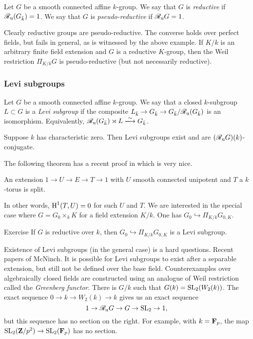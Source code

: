Let $G$ be a smooth connected affine $k$-group. We say that $G$ is 
\emph{reductive} if $\mathscr{R}_{\mathrm{u}} (G_{\bar k})=1$. We say that $G$ is 
\emph{pseudo-reductive} if $\mathscr{R}_{\mathrm{u}}  G=1$. 

Clearly reductive groups are pseudo-reductive. The converse holds over 
perfect fields, but fails in general, as is witnessed by the above example. 
If $K/k$ is an arbitrary finite field extension and $G$ is a reductive 
$K$-group, then the Weil restriction $\Pi_{K/k} G$ is pseudo-reductive 
(but not necessarily reductive). 


\subsubsection{Levi subgroups}

Let $G$ be a smooth connected affine $k$-group. We say that a closed 
$k$-subgroup $L\subset G$ is a \emph{Levi subgroup} if the composite 
$L_{\bar k} \to G_{\bar k} \to G_{\bar k}/\mathscr{R}_{\mathrm{u}} (G_{\bar k})$ is an 
isomorphism. Equivalently, 
$\sR_\unipotent (G_{\bar k})\rtimes L\isomorphism G_{\bar k}$. 

\begin{theo}[Mostow]
Suppose $k$ has characteristic zero. Then Levi subgroups exist and are 
$(\mathscr{R}_{\mathrm{u}} G)(k)$-conjugate. 
\end{theo}

The following theorem has a recent proof in \cite{demarche} which is very nice. 

\begin{theo}[SGA 3]
An extension $1 \to U \to E\to T\to 1$ with $U$ smooth connected unipotent and 
$T$ a $k$-torus is split. 
\end{theo}

In other words, $\operatorname{H}^1(T,U)=0$ for such $U$ and $T$. We are interested in the 
special case where $G=G_0\times_k K$ for a field extension $K/k$. 
One has $G_0\hookrightarrow \Pi_{K/k} G_{0,K}$. 

\begin{enonce}[remark]{Exercise}
If $G$ is reductive over $k$, then $G_0\hookrightarrow \Pi_{K/k} G_{0,K}$ is a 
Levi subgroup. 
\end{enonce}


Existence of Levi subgroups (in the general case) is a hard questions. Recent 
papers of McNinch. It is possible for Levi subgroups to exist after a 
separable extension, but still not be defined over the base field. Counterexamples 
over algebraically closed fields are constructed using an analogue of Weil 
restriction called the \emph{Greenberg functor}. There is $G/k$ such that 
$G(k)=\operatorname{SL}_2(W_2(k))$. The exact sequence 
$0 \to k \to W_2(k) \to k$ gives us an exact sequence 
\[
  1 \to \mathscr{R}_{\mathrm{u}}  G \to G \to \operatorname{SL}_2 \to 1 ,
\]
but this sequence has no section on the right. For example, with 
$k=\mathbf{F}_p$, the map $\operatorname{SL}_2(\mathbf{Z}/p^2) \to \operatorname{SL}_2(\mathbf{F}_p)$ has 
no section. 

